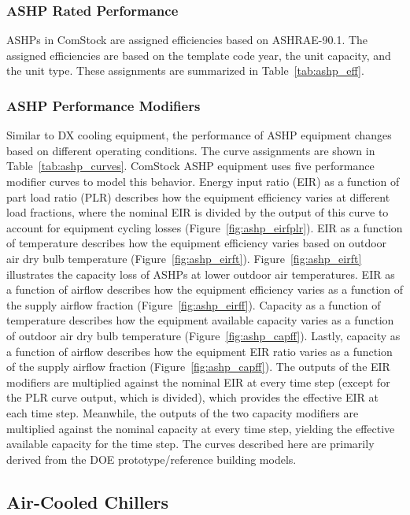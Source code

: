\subsubsection{ASHP Rated Performance}

ASHPs in ComStock are assigned efficiencies based on ASHRAE-90.1. The assigned efficiencies are based on the template code year, the unit capacity, and the unit type. These assignments are summarized in Table~\ref{tab:ashp_eff}.

\subsubsection{ASHP Performance Modifiers}

Similar to DX cooling equipment, the performance of ASHP equipment changes based on different operating conditions. The curve assignments are shown in Table~\ref{tab:ashp_curves}. ComStock ASHP equipment uses five performance modifier curves to model this behavior. Energy input ratio (EIR) as a function of part load ratio (PLR) describes how the equipment efficiency varies at different load fractions, where the nominal EIR is divided by the output of this curve to account for equipment cycling losses (Figure~\ref{fig:ashp_eirfplr}). EIR as a function of temperature describes how the equipment efficiency varies based on outdoor air dry bulb temperature (Figure~\ref{fig:ashp_eirft}). Figure~\ref{fig:ashp_eirft} illustrates the capacity loss of ASHPs at lower outdoor air temperatures. EIR as a function of airflow describes how the equipment efficiency varies as a function of the supply airflow fraction (Figure~\ref{fig:ashp_eirff}). Capacity as a function of temperature describes how the equipment available capacity varies as a function of outdoor air dry bulb temperature (Figure~\ref{fig:ashp_capff}). Lastly, capacity as a function of airflow describes how the equipment EIR ratio varies as a function of the supply airflow fraction (Figure~\ref{fig:ashp_capff}). The outputs of the EIR modifiers are multiplied against the nominal EIR at every time step (except for the PLR curve output, which is divided), which provides the effective EIR at each time step. Meanwhile, the outputs of the two capacity modifiers are multiplied against the nominal capacity at every time step, yielding the effective available capacity for the time step. The curves described here are primarily derived from the DOE prototype/reference building models.    


\subsection{Air-Cooled Chillers}


